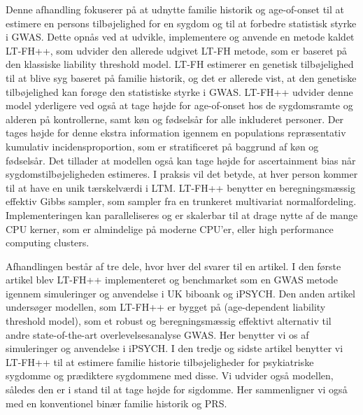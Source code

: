 Denne afhandling fokuserer på at udnytte familie historik og age-of-onset til at estimere en persons tilbøjelighed for en sygdom og til at forbedre statistisk styrke i GWAS. Dette opnås ved at udvikle, implementere og anvende en metode kaldet LT-FH++, som udvider den allerede udgivet LT-FH metode, som er baseret på den klassiske liability threshold model. LT-FH estimerer en genetisk tilbøjelighed til at blive syg baseret på familie historik, og det er allerede vist, at den genetiske tilbøjelighed kan forøge den statistiske styrke i GWAS. LT-FH++ udvider denne model yderligere ved også at tage højde for age-of-onset hos de sygdomsramte og alderen på kontrollerne, samt køn og fødselsår for alle inkluderet personer. Der tages højde for denne ekstra information igennem en populations repræsentativ kumulativ incidensproportion, som er stratificeret på baggrund af køn og fødselsår. Det tillader at modellen også kan tage højde for ascertainment bias når sygdomstilbøjeligheden estimeres. I praksis vil det betyde, at hver person kommer til at have en unik tærskelværdi i LTM. LT-FH++ benytter en beregningsmæssig effektiv Gibbs sampler, som sampler fra en trunkeret multivariat normalfordeling. Implementeringen kan paralleliseres og er skalerbar til at drage nytte af de mange CPU kerner, som er almindelige på moderne CPU'er, eller high performance computing clusters.

Afhandlingen består af tre dele, hvor hver del svarer til en artikel. I den første artikel blev LT-FH++ implementeret og benchmarket som en GWAS metode igennem simuleringer og anvendelse i UK biboank og iPSYCH. Den anden artikel undersøger modellen, som LT-FH++ er bygget på (age-dependent liability threshold model), som et robust og beregningsmæssig effektivt alternativ til andre state-of-the-art overlevelsesanalyse GWAS. Her benytter vi os af simuleringer og anvendelse i iPSYCH. I den tredje og sidste artikel benytter vi LT-FH++ til at estimere familie historie tilbøjeligheder for psykiatriske sygdomme og prædiktere sygdommene med disse. Vi udvider også modellen, således den er i stand til at tage højde for sigdomme. Her sammenligner vi også med en konventionel binær familie historik og PRS.